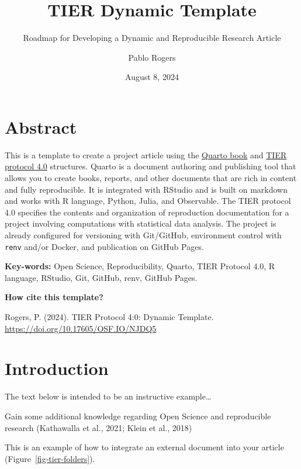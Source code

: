 \documentclass[
  a4paper,
]{article}
\title{TIER Dynamic Template}
\subtitle{Roadmap for Developing a Dynamic and Reproducible Research
Article}
\author{Pablo Rogers}
\date{August 8, 2024}
\begin{document}
\maketitle



\section*{Abstract}\label{abstract}


This is a template to create a project article using the
\href{https://quarto.org/docs/books/}{Quarto book} and
\href{https://www.projecttier.org/tier-protocol/protocol-4-0/}{TIER
protocol 4.0} structures. Quarto is a document authoring and publishing
tool that allows you to create books, reports, and other documents that
are rich in content and fully reproducible. It is integrated with
RStudio and is built on markdown and works with R language, Python,
Julia, and Observable. The TIER protocol 4.0 specifies the contents and
organization of reproduction documentation for a project involving
computations with statistical data analysis. The project is already
configured for versioning with Git/GitHub, environment control with
\texttt{renv} and/or Docker, and publication on GitHub Pages.

\textbf{Key-words:} Open Science, Reproducibility, Quarto, TIER Protocol
4.0, R language, RStudio, Git, GitHub, renv, GitHub Pages.

\textbf{How cite this template?}

Rogers, P. (2024). TIER Protocol 4:0: Dynamic Template.
\url{https://doi.org/10.17605/OSF.IO/NJDQ5}


\section{Introduction}\label{introduction}

The text below is intended to be an instructive example\ldots{}

Gain some additional knowledge regarding Open Science and reproducible
research (Kathawalla et al., 2021; Klein et al., 2018)

This is an example of how to integrate an external document into your
article (Figure~\ref{fig-tier-folders}).
\end{document}
